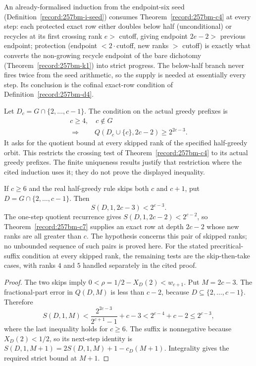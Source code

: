 \begin{thm}\label{record:257bm-c5}
An already-formalised induction from the endpoint-six seed (Definition~\ref{record:257bm-i-seed}) consumes Theorem~\ref{record:257bm-c4} at
every step: each protected exact row either doubles below half
(unconditional) or recycles at its first crossing rank $e > $ cutoff, giving endpoint
$2e-2 > $ previous endpoint; protection (endpoint $< 2\cdot$cutoff, new ranks $>$
cutoff) is exactly what converts the non-growing recycle endpoint of the bare dichotomy
(Theorem~\ref{record:257bm-k1}) into strict progress. The below-half branch never fires twice from the seed
arithmetic, so the supply is needed at essentially every step. Its conclusion is
the cofinal exact-row condition of Definition~\ref{record:257bm-d4}.
\end{thm}

\begin{thm}\label{record:257bm-c6}
Let $D_c=G\cap\{2,\ldots,c-1\}$.  The condition on the actual greedy
prefixes is
\[
 \begin{gathered}
 c\ge4,\quad c\notin G\\
 \Longrightarrow\qquad Q(D_c\cup\{c\},2c-2)\ge2^{2c-3}.
 \end{gathered}
\]
It asks for the quotient bound at every skipped rank of the specified
half-greedy orbit.  This restricts the crossing test of
Theorem~\ref{record:257bm-c4} to its actual greedy prefixes.  The finite
uniqueness results justify that restriction where the cited induction
uses it; they do not prove the displayed inequality.
\end{thm}

\begin{thm}\label{record:257bm-c6a}
If $c\ge6$ and the real half-greedy rule skips both $c$ and $c+1$,
put $D=G\cap\{2,\ldots,c-1\}$.  Then
\[
 S(D,1,2c-3)<2^{c-3}.
\]
The one-step quotient recurrence gives
$S(D,1,2c-2)<2^{c-2}$, so
Theorem~\ref{record:257bm-c7} supplies an exact row at depth $2c-2$
whose new ranks are all greater than $c$.
The hypothesis concerns this pair of skipped ranks; no unbounded
sequence of such pairs is proved here.  For the stated precritical-suffix
condition at every skipped rank, the remaining tests are the
skip-then-take cases, with ranks $4$ and $5$ handled separately in
the cited proof.
\end{thm}
\begin{proof}
The two skips imply $0<\rho=1/2-X_D(2)<w_{c+1}$.
Put $M=2c-3$.  The fractional-part error in $Q(D,M)$ is less
than $c-2$, because $D\subseteq\{2,\ldots,c-1\}$.  Therefore
\[
 S(D,1,M)
 <\frac{2^{2c-3}}{2^{c+1}-1}+c-3
 <2^{c-4}+c-2\le2^{c-3},
\]
where the last inequality holds for $c\ge6$.
The suffix is nonnegative because $X_D(2)<1/2$, so its next-step
identity is $S(D,1,M+1)=2S(D,1,M)+1-c_D(M+1)$.
Integrality gives the required strict bound at $M+1$.
\end{proof}


